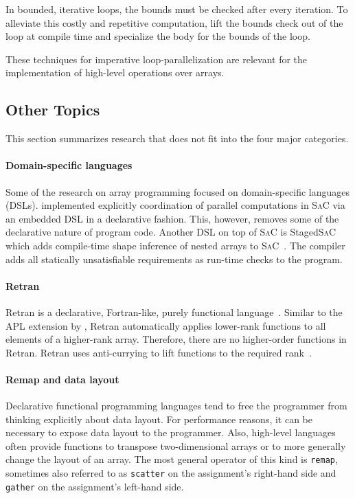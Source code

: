 \documentclass[a4paper]{article}
\newcommand{\sac}{S\textsc{a}C}
\begin{document}
In bounded, iterative loops, the bounds must be checked after every iteration. To alleviate this costly and repetitive computation, \citet{Henriksen:2014:BCI:2627373.2627388} lift the bounds check out of the loop at compile time and specialize the body for the bounds of the loop.

These techniques for imperative loop-parallelization are relevant for the implementation of high-level operations over arrays.

\subsection{Other Topics}
\label{sec:other-topics}

This section summarizes research that does not fit into the four major categories.

\paragraph{Domain-specific languages}

Some of the research on array programming focused on domain-specific languages (DSLs). \citet{4228136} implemented explicitly coordination of parallel computations in \sac{} via an embedded DSL in a declarative fashion. This, however, removes some of the declarative nature of program code. Another DSL on top of \sac{} is Staged\sac{} which adds compile-time shape inference of nested arrays to \sac{}~\cite{Ureche:2012:SCS:2103746.2103762}. The compiler adds all statically unsatisfiable requirements as run-time checks to the program.

\paragraph{Retran}

Retran is a declarative, Fortran-like, purely functional language~\cite{367042}. Similar to the APL extension by \citet{Lowney:1981:CAI:567532.567533}, Retran automatically applies lower-rank functions to all elements of a higher-rank array. Therefore, there are no higher-order functions in Retran. Retran uses anti-currying to lift functions to the required rank~\cite{367042}.

\paragraph{Remap and data layout}

Declarative functional programming languages tend to free the programmer from thinking explicitly about data layout. For performance reasons, it can be necessary to expose data layout to the programmer. Also, high-level languages often provide functions to transpose two-dimensional arrays or to more generally change the layout of an array. The most general operator of this kind is \texttt{remap}, sometimes also referred to as \texttt{scatter} on the assignment's right-hand side and \texttt{gather} on the assignment's left-hand side.
\end{document}

